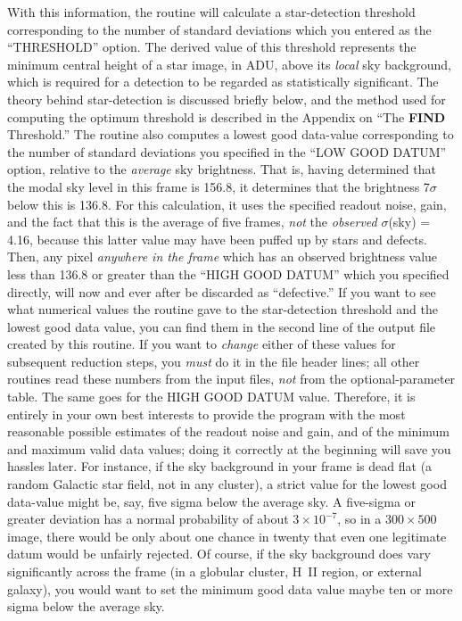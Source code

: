 With this information, the routine will calculate a star-detection
threshold corresponding to the number of standard deviations which you
entered as the ``THRESHOLD'' option.  The derived value of this
threshold represents the minimum central height of a star image, in
ADU, above its {\it local\/} sky background, which is required for a
detection to be regarded as statistically significant.  The theory
behind star-detection is discussed briefly below, and the method used
for computing the optimum threshold is described in the Appendix on
``The {\bf FIND} Threshold.'' The routine also computes a lowest good
data-value corresponding to the number of standard deviations you
specified in the ``LOW GOOD DATUM'' option, relative to the {\it
average\/} sky brightness.  That is, having determined that the modal
sky level in this frame is 156.8, it determines that the brightness
7$\sigma$ below this is 136.8.  For this calculation, it uses the
specified readout noise, gain, and the fact that this is the average of
five frames, {\it not\/} the {\it observed\/} $\sigma$(sky) = 4.16,
because this latter value may have been puffed up by stars and
defects.  Then, any pixel {\it anywhere in the frame\/} which has an
observed brightness value less than 136.8 or greater than the ``HIGH
GOOD DATUM'' which you specified directly, will now and ever after be
discarded as ``defective.''  If you want to see what numerical values
the routine gave to the star-detection threshold and the lowest good
data value, you can find them in the second line of the output file
created by this routine.  If you want to {\it change\/} either of these
values for subsequent reduction steps, you {\it must\/} do it in the
file header lines; all other routines read these numbers from the input
files, {\it not\/} from the optional-parameter table.  The same goes
for the HIGH GOOD DATUM value.  Therefore, it is entirely in your own
best interests to provide the program with the most reasonable possible
estimates of the readout noise and gain, and of the minimum and maximum
valid data values; doing it correctly at the beginning will save you
hassles later.  For instance, if the sky background in your frame is
dead flat (a random Galactic star field, not in any cluster), a strict
value for the lowest good data-value might be, say, five sigma below
the average sky.  A five-sigma or greater deviation has a normal
probability of about $3 \times 10^{-7}$, so in a $300 \times 500$
image, there would be only about one chance in twenty that even one
legitimate datum would be unfairly rejected.  Of course, if the sky
background does vary significantly across the frame (in a globular
cluster, H~II region, or external galaxy), you would want to set the
minimum good data value maybe ten or more sigma below the average sky.

